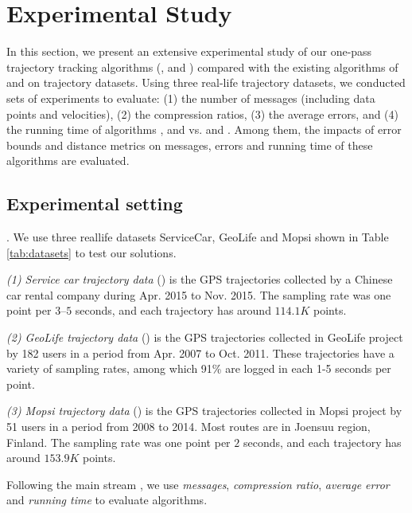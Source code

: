 \section{Experimental Study}
\label{sec-exp}




In this section, we present an extensive experimental study of our one-pass trajectory tracking algorithms (\citt, \sitt and \bitt) compared with the
existing algorithms of \ldrh and \grts on trajectory datasets. Using three real-life trajectory datasets, we conducted sets of experiments to evaluate:
(1) the number of messages (including data points and velocities),
(2) the compression ratios,
(3) the average errors, and
(4) the running time of algorithms \citt, \sitt and \bitt vs. \ldrh and \grts. 
Among them, the impacts of error bounds and distance metrics on messages, errors and running time of these algorithms are evaluated. 

\subsection{Experimental setting}

. We use three reallife datasets ServiceCar, GeoLife and Mopsi shown in Table \ref{tab:datasets} to test our solutions.

\vspace{0.5ex}
\ni \emph{(1) Service car trajectory data} (\sercar) is the GPS trajectories collected by a Chinese car rental company during Apr. 2015 to Nov. 2015. The sampling rate was one point per $3$--$5$ seconds, and
each trajectory has around $114.1K$ points.

\vspace{0.5ex}
\ni \emph{(2) GeoLife trajectory data} (\geolife) is the GPS trajectories collected in GeoLife project by 182 users in a period from Apr. 2007 to Oct. 2011. These trajectories have a variety of sampling rates, among which 91\% are logged in each 1-5 seconds per point. %

\vspace{0.5ex}
\ni \emph{(3) Mopsi trajectory data} (\mopsi) is the GPS trajectories collected in Mopsi project by 51 users in a period from 2008 to 2014. Most routes are in Joensuu region, Finland.
The sampling rate was one point per $2$ seconds, and each trajectory has around $153.9K$ points.

Following the main stream \cite{Trajcevski:LDRH, Lange:GRTS, Lange:Tracking, Lin:Cised, Zhang:Evaluation}, we use \emph{messages}, \emph{compression ratio}, \emph{average error} and \emph{running time} to evaluate algorithms.

